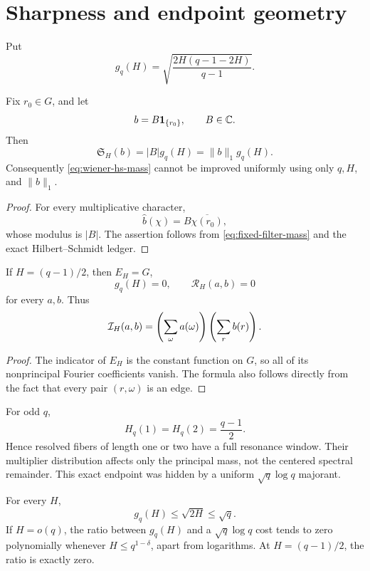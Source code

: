 \section{Sharpness and endpoint geometry}
\label{sec:sharpness}

Put
\begin{equation}
 g_q(H)
 =
 \sqrt{\frac{2H(q-1-2H)}{q-1}}.
\label{eq:gq}
\end{equation}

\begin{proposition}
\label{prop:delta-sharp}
Fix \(r_0\in G\), and let
\[
 b=B\mathbf 1_{\{r_0\}},\qquad B\in\mathbb C.
\]
Then
\[
 \mathfrak S_H(b)=|B|g_q(H)=\|b\|_1g_q(H).
\]
Consequently \eqref{eq:wiener-hs-mass} cannot be improved uniformly
using only \(q,H\), and \(\|b\|_1\).
\end{proposition}

\begin{proof}
For every multiplicative character,
\[
 \widehat b(\chi)=B\overline{\chi(r_0)},
\]
whose modulus is \(|B|\).  The assertion follows from
\eqref{eq:fixed-filter-mass} and the exact Hilbert--Schmidt ledger.
\end{proof}

\begin{proposition}
\label{prop:full-window}
If \(H=(q-1)/2\), then \(E_H=G\),
\[
 g_q(H)=0,\qquad
 \mathcal R_H(a,b)=0
\]
for every \(a,b\).  Thus
\[
 \mathcal I_H(a,b)
 =
 \left(\sum_\omega a(\omega)\right)
 \left(\sum_r b(r)\right).
\]
\end{proposition}

\begin{proof}
The indicator of \(E_H\) is the constant function on \(G\), so all
of its nonprincipal Fourier coefficients vanish.  The formula also
follows directly from the fact that every pair \((r,\omega)\) is an
edge.
\end{proof}

\begin{remark}
For odd \(q\),
\[
 H_q(1)=H_q(2)=\frac{q-1}{2}.
\]
Hence resolved fibers of length one or two have a full resonance
window.  Their multiplier distribution affects only the principal
mass, not the centered spectral remainder.  This exact endpoint was
hidden by a uniform \(\sqrt q\log q\) majorant.
\end{remark}

\begin{proposition}
\label{prop:comparison}
For every \(H\),
\[
 g_q(H)\le\sqrt{2H}\le\sqrt q.
\]
If \(H=o(q)\), the ratio between \(g_q(H)\) and a
\(\sqrt q\log q\) cost tends to zero polynomially whenever
\(H\le q^{1-\delta}\), apart from logarithms.  At
\(H=(q-1)/2\), the ratio is exactly zero.
\end{proposition}

